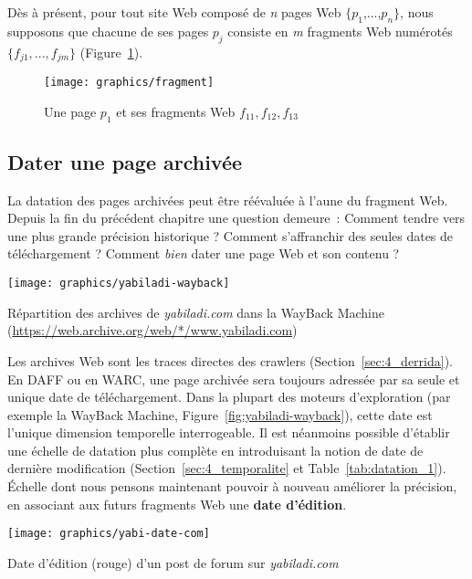 \documentclass[symmetric,justified,marginals=raggedouter]{tufte-book}
\begin{document}
Dès à présent, pour tout site Web composé de \textit{n} pages Web $\{p_1$,...,$p_n\}$, nous supposons que chacune de ses pages $p_j$ consiste en \textit{m} fragments Web numérotés $\{f_{j1},...,f_{jm}\}$ (Figure~\ref{fig:fragment}).

\begin{figure}%
  \texttt{[image: graphics/fragment]}
  \caption{Une page $p_1$ et ses fragments Web $f_{11}, f_{12}, f_{13}$}
  \label{fig:fragment}
\end{figure}

\subsection{Dater une page archivée}

\noindent La datation des pages archivées peut être réévaluée à l'aune du fragment Web. Depuis la fin du précédent chapitre une question demeure~: Comment tendre vers une plus grande précision historique ? Comment s'affranchir des seules dates de téléchargement ? Comment \textit{bien} dater une page Web et son contenu ?

\begin{marginfigure}%
  \texttt{[image: graphics/yabiladi-wayback]}
  \caption{Répartition des archives de \textit{yabiladi.com} dans la WayBack Machine (\url{https://web.archive.org/web/*/www.yabiladi.com})}
  \label{fig:yabiladi-wayback}
\end{marginfigure}

Les archives Web sont les traces directes des crawlers (Section~\ref{sec:4_derrida}). En DAFF ou en WARC, une page archivée sera toujours adressée par sa seule et unique date de téléchargement. Dans la plupart des moteurs d'exploration (par exemple la WayBack Machine, Figure~\ref{fig:yabiladi-wayback}), cette date est l'unique dimension temporelle interrogeable. Il est néanmoins possible d'établir une échelle de datation plus complète en introduisant la notion de date de dernière modification (Section~\ref{sec:4_temporalite} et Table~\ref{tab:datation_1}). Échelle dont nous pensons maintenant pouvoir à nouveau améliorer la précision, en associant aux futurs fragments Web une \textbf{date d'édition}. 

\begin{marginfigure}%
  \texttt{[image: graphics/yabi-date-com]}
  \caption{Date d'édition (rouge) d'un post de forum sur \textit{yabiladi.com}}
  \label{fig:yabi-date-com}
\end{marginfigure}  
\end{document}
